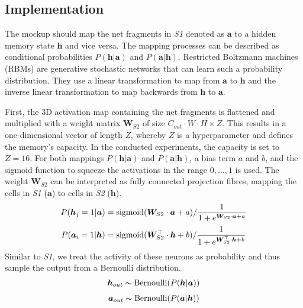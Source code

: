 \subsection{Implementation}
The mockup should map the net fragments in \emph{S1} denoted as $\boldsymbol{a}$ to a hidden memory state $\boldsymbol{h}$ and vice versa. The mapping processes can be described as conditional probabilities $P(\boldsymbol{h}|\boldsymbol{a})$ and $P(\boldsymbol{a}|\boldsymbol{h})$.
Restricted Boltzmann machines (RBMs)  are generative stochastic networks that can learn such a probability distribution.
They use a linear transformation to map from $\boldsymbol{a}$ to $\boldsymbol{h}$ and the inverse linear transformation to map backwards from $\boldsymbol{h}$ to $\boldsymbol{a}$.

First, the 3D activation map containing the net fragments is flattened and multiplied with a weight matrix $\boldsymbol{W}_{S2}$ of size $C_{out}\cdot W\cdot H \times Z$. This results in a one-dimensional vector of length $Z$, whereby $Z$ is a hyperparameter and defines the memory's capacity.
In the conducted experiments, the capacity is set to $Z=16$.
For both mappings $P(\boldsymbol{h}|\boldsymbol{a})$ and $P(\boldsymbol{a}|\boldsymbol{h})$, a bias term $a$ and $b$, and the sigmoid function to squeeze the activations in the range $0, ..., 1$ is used. 
The weight $\boldsymbol{W}_{S2}$ can be interpreted as fully connected projection fibres, mapping the cells in \emph{S1} ($\boldsymbol{a}$) to cells in \emph{S2} ($\boldsymbol{h}$).
\begin{align}\eqlbl{l2_1}
	P(\boldsymbol{h}_j=1 | \boldsymbol{a}) = \text{sigmoid}(\boldsymbol{W}_{S2} \cdot \boldsymbol{a} + a) / \frac{1}{1 + e^{\boldsymbol{W}_{S2} \cdot \boldsymbol{a} + a}}
\end{align}
\begin{align}\eqlbl{l2_2}
	P(\boldsymbol{a}_i=1 | \boldsymbol{h}) = \text{sigmoid}(\boldsymbol{W}_{S2}^\top \cdot \boldsymbol{h} + b) / \frac{1}{1 + e^{\boldsymbol{W}_{S2}^\top \cdot \boldsymbol{h} + b}}
\end{align}
Similar to \emph{S1}, we treat the activity of these neurons as probability and thus sample the output from a Bernoulli distribution.
\begin{align}\eqlbl{l2_3}
	\boldsymbol{h}_{out} \thicksim \text{Bernoulli}(P(\boldsymbol{h} | \boldsymbol{a}) )
\end{align}
\begin{align}\eqlbl{l2_4}
	\boldsymbol{a}_{out} \thicksim \text{Bernoulli}(P(\boldsymbol{a} | \boldsymbol{h}))
\end{align}

